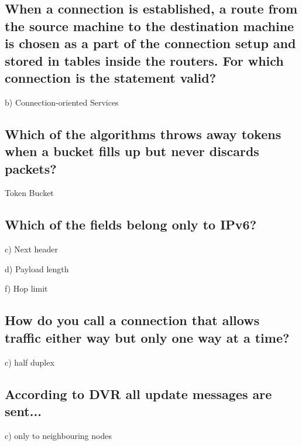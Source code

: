 \documentclass[a4paper,
			llpt,
			solution,
			accentcolor=tud2d,
			colorbacktitle
			]
			{tudexercise}
\newcommand{\8}{$\infty$}
\begin{document}
\subsection{When a connection is established, a route from the source machine to the destination machine is chosen as a part of the connection setup and stored in tables inside the routers. For which connection is the statement valid?}
\begin{compactenum}
\item[b)]{Connection-oriented Services}
\end{compactenum}
\subsection{Which of the algorithms throws away tokens when a bucket fills up but never discards packets?}
\begin{compactenum}
\item Token Bucket
\end{compactenum}
\subsection{Which of the fields belong only to IPv6?}
\begin{compactenum}
\item[c)] Next header
\item[d)] Payload length
\item[f)] Hop limit
\end{compactenum}
\subsection{How do you call a connection that allows traffic either way but only one way at a time?}
\begin{compactenum}
\item[c)]{half duplex}
\end{compactenum}
\subsection{According to DVR all update messages are sent...}
\begin{compactenum}
\item[c)]{only to neighbouring nodes}
\end{compactenum}
\end{document}
